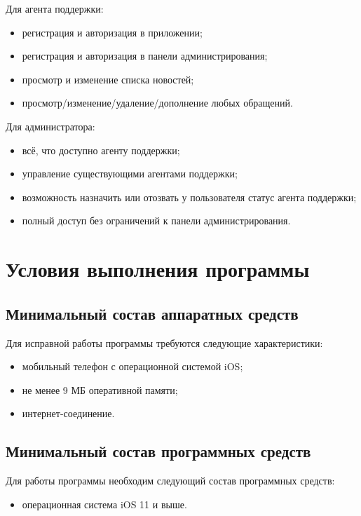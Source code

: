 \documentclass{../includes/TechDoc}
\begin{document}
    Для агента поддержки:
    \begin{itemize}[noitemsep]
        \item регистрация и авторизация в приложении;
        \item регистрация и авторизация в панели администрирования;
        \item просмотр и изменение списка новостей;
        \item просмотр/изменение/удаление/дополнение любых обращений.
    \end{itemize}

    Для администратора:
    \begin{itemize}[noitemsep]
        \item всё, что доступно агенту поддержки;
        \item управление существующими агентами поддержки;
        \item возможность назначить или отозвать у пользователя статус агента поддержки;
        \item полный доступ без ограничений к панели администрирования.
    \end{itemize}


    \section{Условия выполнения программы}

    \subsection{Минимальный состав аппаратных средств}

    Для исправной работы программы требуются следующие характеристики:
    \begin{itemize}[noitemsep]
        \item мобильный телефон с операционной системой iOS;
        \item не менее 9 МБ оперативной памяти;
        \item интернет-соединение.
    \end{itemize}

    \subsection{Минимальный состав программных средств}

    Для работы программы необходим следующий состав программных средств:
    \begin{itemize}[noitemsep]
        \item операционная система iOS 11 и выше.
    \end{itemize}
\end{document}
